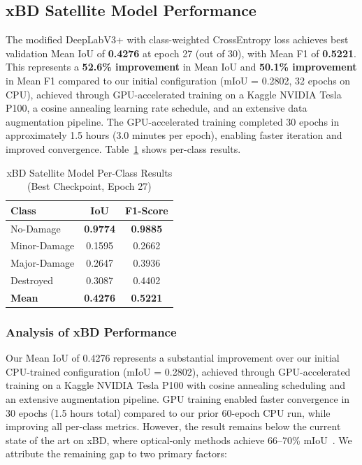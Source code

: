 \documentclass[journal]{IEEEtran}
\begin{document}
\subsection{xBD Satellite Model Performance}

The modified DeepLabV3+ with class-weighted CrossEntropy loss achieves best validation Mean IoU of \textbf{0.4276} at epoch 27 (out of 30), with Mean F1 of \textbf{0.5221}. This represents a \textbf{52.6\% improvement} in Mean IoU and \textbf{50.1\% improvement} in Mean F1 compared to our initial configuration (mIoU = 0.2802, 32 epochs on CPU), achieved through GPU-accelerated training on a Kaggle NVIDIA Tesla P100, a cosine annealing learning rate schedule, and an extensive data augmentation pipeline. The GPU-accelerated training completed 30 epochs in approximately 1.5 hours (3.0 minutes per epoch), enabling faster iteration and improved convergence. Table~\ref{tab:xbd_results} shows per-class results.

\begin{table}[!t]
\centering
\caption{xBD Satellite Model Per-Class Results (Best Checkpoint, Epoch 27)}
\label{tab:xbd_results}
\begin{tabular}{lcc}
\toprule
\textbf{Class} & \textbf{IoU} & \textbf{F1-Score} \\
\midrule
No-Damage & \textbf{0.9774} & \textbf{0.9885} \\
Minor-Damage & 0.1595 & 0.2662 \\
Major-Damage & 0.2647 & 0.3936 \\
Destroyed & 0.3087 & 0.4402 \\
\midrule
\textbf{Mean} & \textbf{0.4276} & \textbf{0.5221} \\
\bottomrule
\end{tabular}
\end{table}

\subsubsection{Analysis of xBD Performance}

Our Mean IoU of 0.4276 represents a substantial improvement over our initial CPU-trained configuration (mIoU = 0.2802), achieved through GPU-accelerated training on a Kaggle NVIDIA Tesla P100 with cosine annealing scheduling and an extensive augmentation pipeline. GPU training enabled faster convergence in 30 epochs (1.5 hours total) compared to our prior 60-epoch CPU run, while improving all per-class metrics. However, the result remains below the current state of the art on xBD, where optical-only methods achieve 66--70\% mIoU~\cite{benson2025xbdsota}. We attribute the remaining gap to two primary factors:
\end{document}

